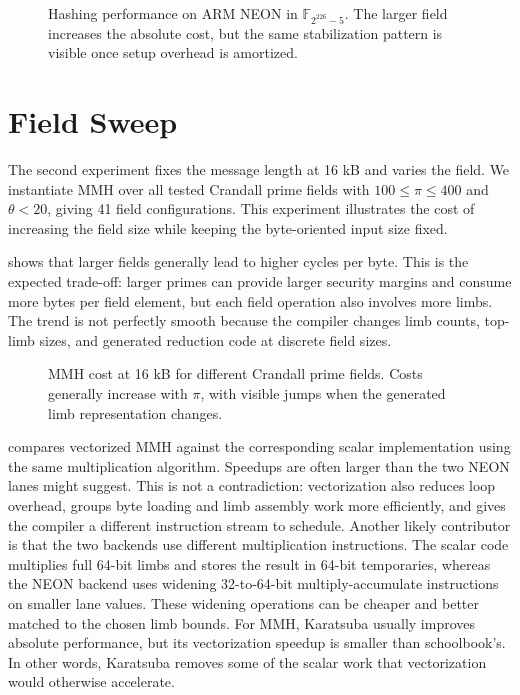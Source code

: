 \begin{figure}[!htbp]
    \centering
    \resizebox{\textwidth}{!}{%
        
    }
    \caption{Hashing performance on ARM NEON in \(\mathbb{F}_{2^{226}-5}\). The larger field increases the absolute cost, but the same stabilization pattern is visible once setup overhead is amortized.}
    \label{fig:hashing_gf2265}
\end{figure}
\clearpage

\section{Field Sweep}
\label{sec:evaluation-field-sweep}

The second experiment fixes the message length at 16 kB and varies the field. We instantiate MMH over all tested Crandall prime fields with \(100\leq \pi \leq 400\) and \(\theta < 20\), giving 41 field configurations. This experiment illustrates the cost of increasing the field size while keeping the byte-oriented input size fixed.

 shows that larger fields generally lead to higher cycles per byte. This is the expected trade-off: larger primes can provide larger security margins and consume more bytes per field element, but each field operation also involves more limbs. The trend is not perfectly smooth because the compiler changes limb counts, top-limb sizes, and generated reduction code at discrete field sizes.

\begin{figure}[!htbp]
    \centering
    \resizebox{\textwidth}{!}{%
        
    }
    \caption{MMH cost at 16 kB for different Crandall prime fields. Costs generally increase with \(\pi\), with visible jumps when the generated limb representation changes.}
    \label{fig:sweep_perf_mmh}
\end{figure}
\clearpage

 compares vectorized MMH against the corresponding scalar implementation using the same multiplication algorithm. Speedups are often larger than the two NEON lanes might suggest. This is not a contradiction: vectorization also reduces loop overhead, groups byte loading and limb assembly work more efficiently, and gives the compiler a different instruction stream to schedule. Another likely contributor is that the two backends use different multiplication instructions. The scalar code multiplies full 64-bit limbs and stores the result in 64-bit temporaries, whereas the NEON backend uses widening 32-to-64-bit multiply-accumulate instructions on smaller lane values. These widening operations can be cheaper and better matched to the chosen limb bounds. For MMH, Karatsuba usually improves absolute performance, but its vectorization speedup is smaller than schoolbook's. In other words, Karatsuba removes some of the scalar work that vectorization would otherwise accelerate.

